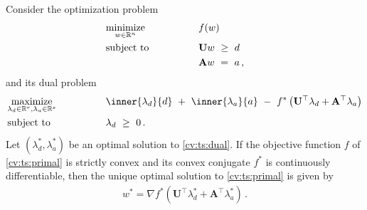
\begin{ftheorem}
  Consider the optimization problem
\begin{align}
  \label{cv:ts:primal}
    &\underset{w \in \R^n}
    {\mathrm{minimize}}
    &&\qquad\qquad
    f(w)
    &&&
    \\
    \nonumber
    &\mathrm{subject}\ \mathrm{to} 
    &&\qquad\qquad
    \mathbf{U}w
    \ 
    \ge
    \ 
    d
    \\
    \nonumber
    &
    &&\qquad\qquad
    \mathbf{A}w
    \ 
    =
    \ 
    a
    \,,
\end{align}
and its dual problem
  \begin{alignat}{2}
    \label{cv:ts:dual}
    &\underset{
    \lambda_d \in \R^r
,
    \lambda_a \in \R^s
  }
    {\mathrm{maximize}}
    &&\qquad\qquad
    \inner
    {\lambda_d}
    {d}
    \ 
    +
    \ 
    \inner
    {\lambda_a}
    {a}
    \ 
    -
    \ 
    f^*
    \left( 
      \mathbf{U}^\top  \lambda_d
      +
      \mathbf{A}^\top  \lambda_a
    \right)
    \\
    \nonumber
    &\mathrm{subject}\ \mathrm{to} 
    &&\qquad\qquad
    \lambda_d
    \ 
    \ge
    \ 
    0
    \,.
\end{alignat}
  Let 
$
(\lambda_d^*,\lambda_a^*)
$
be an optimal solution to \eqref{cv:ts:dual}.
If the objective function $f$ of 
\eqref{cv:ts:primal} is strictly convex and its
convex conjugate $f^*$ is continuously differentiable,
then the unique optimal solution to 
\eqref{cv:ts:primal}
is given by
\begin{gather}
  w^*
  =
  \nabla
    f^*
    \left( 
      \mathbf{U}^\top  \lambda_d^*
      +
      \mathbf{A}^\top  \lambda_a^*
    \right)
    \,.
\end{gather}
\end{ftheorem}
